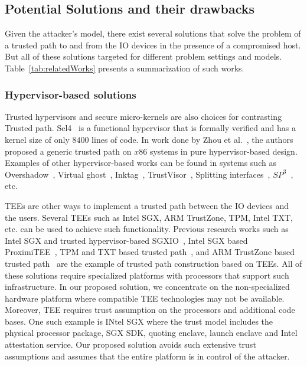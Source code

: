 \subsection{Potential Solutions and their drawbacks}

Given the attacker's model, there exist several solutions that solve the problem of a trusted path to and from the IO devices in the presence of a compromised host. But all of these solutions targeted for different problem settings and models. Table~\ref{tab:relatedWorks} presents a summarization of such works.


\subsubsection{Hypervisor-based solutions} Trusted hypervisors and secure micro-kernels are also choices for contrasting Trusted path. Sel4~\cite{klein2009sel4} is a functional hypervisor that is formally verified and has a kernel size of only $8400$ lines of code. In work done by Zhou et al.~\cite{zhou2012building}, the authors proposed a generic trusted path on $x86$ systems in pure hypervisor-based design. Examples of other hypervisor-based works can be found in systems such as Overshadow~\cite{Overshadow}, Virtual ghost~\cite{criswell2014virtual}, Inktag~\cite{hofmann2013inktag}, TrustVisor~\cite{mccune2010trustvisor}, Splitting interfaces~\cite{ta2006splitting}, $SP^3$~\cite{yang2008using}, etc.

 TEEs are other ways to implement a trusted path between the IO devices and the users. Several TEEs such as Intel SGX, ARM TrustZone, TPM, Intel TXT, etc. can be used to achieve such functionality. Previous research works such as Intel SGX and trusted hypervisor-based SGXIO~\cite{weiser2017sgxio}, Intel SGX based ProximiTEE~\cite{dhar2018proximitee}, TPM and TXT based trusted path~\cite{filyanov2011uni}, and ARM TrustZone based trusted path~\cite{filyanov2011uni,sun2015trustotp} are the example of trusted path construction based on TEEs. All of these solutions require specialized platforms with processors that support such infrastructure. In our proposed solution, we concentrate on the non-specialized hardware platform where compatible TEE technologies may not be available.
Moreover, TEE requires trust assumption on the processors and additional code bases. One such example is INtel SGX where the trust model includes the physical processor package, SGX SDK, quoting enclave, launch enclave and Intel attestation service. Our proposed solution avoids such extensive trust assumptions and assumes that the entire platform is in control of the attacker.


